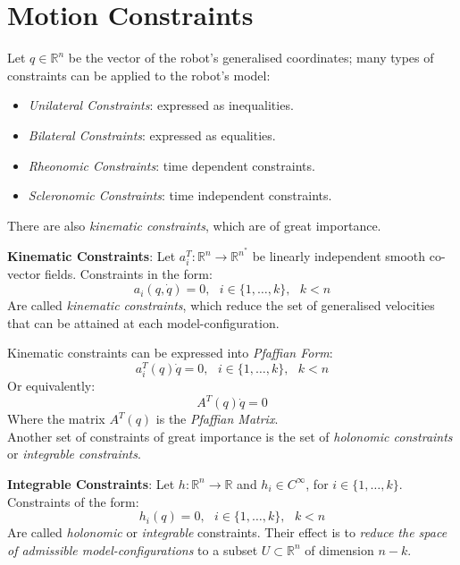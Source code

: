 \section{Motion Constraints}
Let $q \in \mathbb{R}^{n}$ be the vector of the robot's generalised coordinates; many types of constraints can be applied to the robot's model:
\begin{itemize}
    \item \textit{Unilateral Constraints}: expressed as inequalities. 
    \item \textit{Bilateral Constraints}: expressed as equalities.
    \item \textit{Rheonomic Constraints}: time dependent constraints.
    \item \textit{Scleronomic Constraints}: time independent constraints.
\end{itemize}
There are also \textit{kinematic constraints}, which are of great importance.
\begin{definition}\label{kin_constrs_def}
    \textbf{Kinematic Constraints}: Let $a_i^T:\mathbb{R}^{n}\rightarrow\mathbb{R}^{n^*}$ be linearly independent smooth co-vector fields. Constraints in the form:
    \begin{equation}\label{kine_constrs}
        a_i(q,\dot{q})=0, \text{ } i\in \{1,\dots,k\}, \textbf{ }k<n
    \end{equation}
    Are called \textit{kinematic constraints}, which reduce the set of generalised velocities that can be attained at each model-configuration.
\end{definition}
Kinematic constraints can be expressed into \textit{Pfaffian Form}:
\begin{equation}\label{Pfaffian_form}
    a_i^T(q)\dot{q}=0, \textbf{ } i \in \{1,\dots,k\}, \textbf{ }k<n
\end{equation}
Or equivalently:
\begin{equation}\label{pfaffian_matrix}
    A^T(q)\dot{q}=0
\end{equation}
Where the matrix $A^T(q)$ is the \textit{Pfaffian Matrix}. \\
Another set of constraints of great importance is the set of
\textit{holonomic constraints} or \textit{integrable constraints}.
\begin{definition}\label{holo_constr_def}
    \textbf{Integrable Constraints}: Let $h:\mathbb{R}^{n} \rightarrow \mathbb{R}$ and $h_i \in C^\infty$, for $i \in \{1,\dots,k\}$. Constraints of the form:
    \begin{equation}\label{holo_constrs}
        h_i(q)=0, \text{ }i\in \{1,\dots,k\}, \text{ } k<n
    \end{equation}
    Are called \textit{holonomic} or \textit{integrable} constraints. Their effect is to \textit{reduce the space of admissible model-configurations} to a subset $U \subset \mathbb{R}^{n}$ of dimension $n-k$.
\end{definition}
